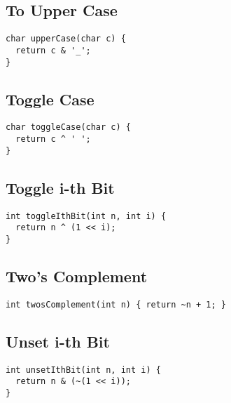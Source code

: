 \documentclass[twoside]{article}
\begin{document}
\begin{multicols*}{2}
\subsectionfont{\large\bfseries\sffamily\underline}
\subsection*{To Upper Case}
\begin{verbatim}
char upperCase(char c) {
  return c & '_';
}
\end{verbatim}

\subsectionfont{\large\bfseries\sffamily\underline}
\subsection*{Toggle Case}
\begin{verbatim}
char toggleCase(char c) {
  return c ^ ' ';
}
\end{verbatim}

\subsectionfont{\large\bfseries\sffamily\underline}
\subsection*{Toggle i-th Bit}
\begin{verbatim}
int toggleIthBit(int n, int i) {
  return n ^ (1 << i);
}
\end{verbatim}

\subsectionfont{\large\bfseries\sffamily\underline}
\subsection*{Two's Complement}
\begin{verbatim}
int twosComplement(int n) { return ~n + 1; }
\end{verbatim}

\subsectionfont{\large\bfseries\sffamily\underline}
\subsection*{Unset i-th Bit}
\begin{verbatim}
int unsetIthBit(int n, int i) {
  return n & (~(1 << i));
}
\end{verbatim}


\end{multicols*}
\end{document}
